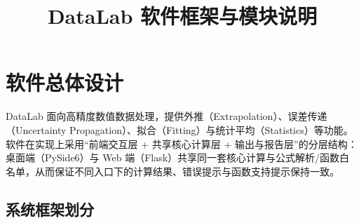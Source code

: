 \documentclass[UTF8,a4paper,11pt]{ctexart}
\title{DataLab 软件框架与模块说明}
\author{}
\date{}
\begin{document}
\maketitle

\section{软件总体设计}

DataLab 面向高精度数值数据处理，提供外推（Extrapolation）、误差传递（Uncertainty Propagation）、拟合（Fitting）与统计平均（Statistics）等功能。软件在实现上采用“前端交互层 + 共享核心计算层 + 输出与报告层”的分层结构：桌面端（PySide6）与 Web 端（Flask）共享同一套核心计算与公式解析/函数白名单，从而保证不同入口下的计算结果、错误提示与函数支持提示保持一致。

\subsection{系统框架划分}
\end{document}
